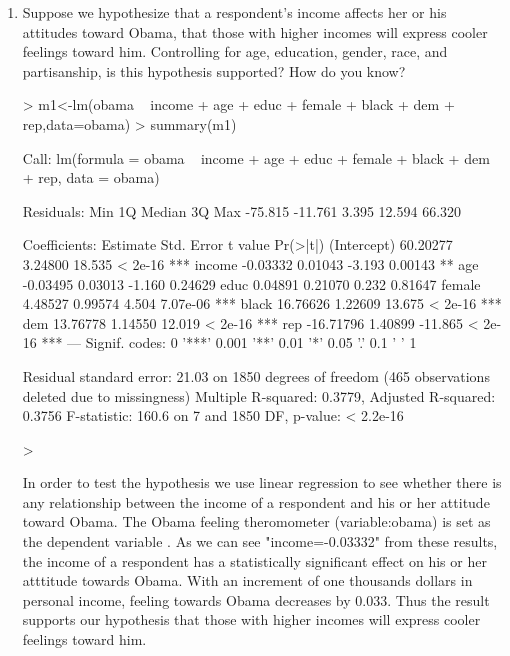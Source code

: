 \documentclass[12pt]{article}
\begin{document}
\begin{enumerate}
\item Suppose we hypothesize that a respondent's income affects her or his attitudes toward Obama, that those with higher incomes will express cooler feelings toward him.  Controlling for age, education, gender, race, and partisanship, is this hypothesis supported?  How do you know?

\begin{Schunk}
\begin{Sinput}
> m1<-lm(obama ~ income + age + educ + female + black + dem + rep,data=obama)
> summary(m1)
\end{Sinput}
\begin{Soutput}
Call:
lm(formula = obama ~ income + age + educ + female + black + dem + 
    rep, data = obama)

Residuals:
    Min      1Q  Median      3Q     Max 
-75.815 -11.761   3.395  12.594  66.320 

Coefficients:
             Estimate Std. Error t value Pr(>|t|)    
(Intercept)  60.20277    3.24800  18.535  < 2e-16 ***
income       -0.03332    0.01043  -3.193  0.00143 ** 
age          -0.03495    0.03013  -1.160  0.24629    
educ          0.04891    0.21070   0.232  0.81647    
female        4.48527    0.99574   4.504 7.07e-06 ***
black        16.76626    1.22609  13.675  < 2e-16 ***
dem          13.76778    1.14550  12.019  < 2e-16 ***
rep         -16.71796    1.40899 -11.865  < 2e-16 ***
---
Signif. codes:  0 '***' 0.001 '**' 0.01 '*' 0.05 '.' 0.1 ' ' 1

Residual standard error: 21.03 on 1850 degrees of freedom
  (465 observations deleted due to missingness)
Multiple R-squared:  0.3779,	Adjusted R-squared:  0.3756 
F-statistic: 160.6 on 7 and 1850 DF,  p-value: < 2.2e-16
\end{Soutput}
\begin{Sinput}
> 
\end{Sinput}
\end{Schunk}
In order to test the hypothesis we use linear regression to see whether there is any relationship between the income of a respondent and his or her attitude toward Obama.  The Obama feeling theromometer (variable:obama) is set as the dependent variable . 
As we can see "income=-0.03332" from these results, the income of a respondent has a statistically significant effect on his or her atttitude towards Obama. With an increment of one thousands dollars in personal income, feeling towards Obama decreases by 0.033.  Thus the result supports our hypothesis that those with higher incomes will express cooler feelings toward him.



\end{enumerate}
\end{document}
